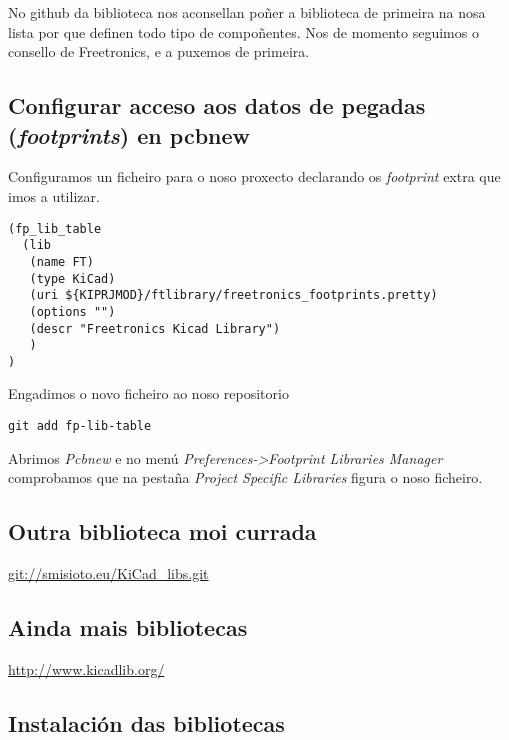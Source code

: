 No github da biblioteca nos aconsellan poñer a biblioteca de primeira na
nosa lista por que definen todo tipo de compoñentes. Nos de momento
seguimos o consello de Freetronics, e a puxemos de primeira.

\subsection{\texorpdfstring{Configurar acceso aos datos de pegadas
(\emph{footprints}) en
pcbnew}{Configurar acceso aos datos de pegadas (footprints) en pcbnew}}\label{configurar-acceso-aos-datos-de-pegadas-footprints-en-pcbnew}

Configuramos un ficheiro para o noso proxecto declarando os
\emph{footprint} extra que imos a utilizar.

\begin{verbatim}
(fp_lib_table
  (lib
   (name FT)
   (type KiCad)
   (uri ${KIPRJMOD}/ftlibrary/freetronics_footprints.pretty)
   (options "")
   (descr "Freetronics Kicad Library")
   )
)
\end{verbatim}

Engadimos o novo ficheiro ao noso repositorio

\begin{verbatim}
git add fp-lib-table
\end{verbatim}

Abrimos \emph{Pcbnew} e no menú
\emph{Preferences-\textgreater{}Footprint Libraries Manager} comprobamos
que na pestaña \emph{Project Specific Libraries} figura o noso ficheiro.

\subsection{Outra biblioteca moi
currada}\label{outra-biblioteca-moi-currada}

\url{git://smisioto.eu/KiCad_libs.git}

\subsection{Ainda mais bibliotecas}\label{ainda-mais-bibliotecas}

\url{http://www.kicadlib.org/}

\subsection{Instalación das
bibliotecas}\label{instalaciuxf3n-das-bibliotecas}

